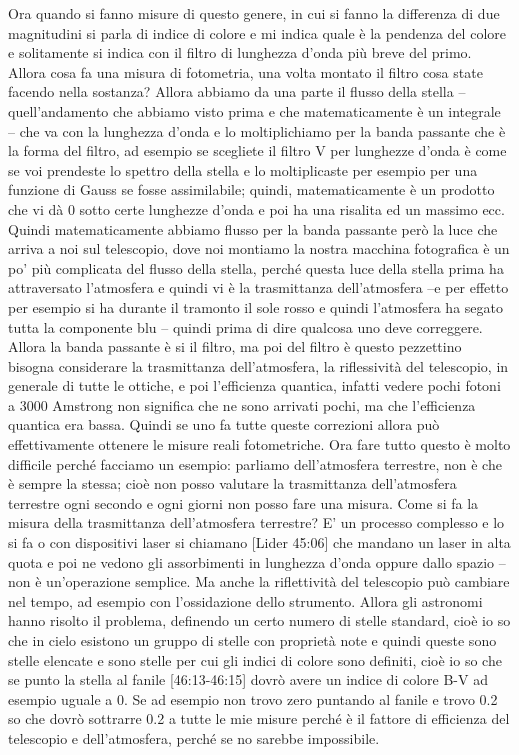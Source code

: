 \documentclass[a4paper,11pt]{article}
\begin{document}
Ora quando si fanno misure di questo genere, in cui si fanno la differenza di due magnitudini si parla di indice di colore e mi indica quale è la pendenza del colore e solitamente si indica con il filtro di lunghezza d’onda più breve del primo. Allora cosa fa una misura di fotometria, una volta montato il filtro cosa state facendo nella sostanza? Allora abbiamo da una parte il flusso della stella – quell’andamento che abbiamo visto prima e che matematicamente è un integrale – che va con la lunghezza d’onda e lo moltiplichiamo per la banda passante che è la forma del filtro, ad esempio se scegliete il filtro V per lunghezze d’onda è come se voi prendeste lo spettro della stella e lo moltiplicaste per esempio per una funzione di Gauss se fosse assimilabile; quindi, matematicamente è un prodotto che vi dà 0 sotto certe lunghezze d’onda e poi ha una risalita ed un massimo ecc. Quindi matematicamente abbiamo flusso per la banda passante  però la luce che arriva a noi sul telescopio, dove noi montiamo la nostra macchina fotografica è un po' più complicata del flusso della stella, perché questa luce della stella prima ha attraversato l’atmosfera e quindi vi è la trasmittanza dell’atmosfera –e per effetto per esempio si ha durante il tramonto il sole rosso e quindi l’atmosfera ha segato tutta la componente blu – quindi prima di dire qualcosa uno deve correggere. Allora la banda passante è si il filtro, ma poi del filtro è questo pezzettino bisogna considerare la trasmittanza dell’atmosfera, la riflessività del telescopio, in generale di tutte le ottiche, e poi l’efficienza quantica, infatti vedere pochi fotoni a 3000 Amstrong non significa che ne sono arrivati pochi, ma che l’efficienza quantica era bassa. Quindi se uno fa tutte queste correzioni allora può effettivamente ottenere le misure reali fotometriche. Ora fare tutto questo è molto difficile perché facciamo un esempio: parliamo dell’atmosfera terrestre, non è che è sempre la stessa; cioè non posso valutare la trasmittanza dell’atmosfera terrestre ogni secondo e ogni giorni non posso fare una misura. Come si fa la misura della trasmittanza dell’atmosfera terrestre? E’ un processo complesso e lo si fa o con dispositivi laser si chiamano [Lider 45:06] che mandano un laser in alta quota e poi ne vedono gli assorbimenti in lunghezza d’onda oppure dallo spazio – non è un’operazione semplice. Ma anche la riflettività del telescopio può cambiare nel tempo, ad esempio con l’ossidazione dello strumento. 
\newline
Allora gli astronomi hanno risolto il problema, definendo un certo numero di stelle standard, cioè io so che in cielo esistono un gruppo di stelle con proprietà note e quindi queste sono stelle elencate e sono stelle per cui gli indici di colore sono definiti, cioè io so che se punto la stella al fanile [46:13-46:15] dovrò avere un indice di colore B-V ad esempio uguale a 0. Se ad esempio non trovo zero puntando al fanile e trovo 0.2 so che dovrò sottrarre 0.2 a tutte le mie misure perché è il fattore di efficienza del telescopio e dell’atmosfera, perché se no sarebbe impossibile.
\end{document}
